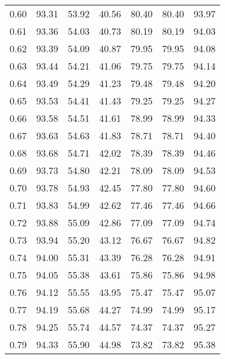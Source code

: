 \begin{tabular}{|c|c|c|c|c|c|c|}
      0.60 &     93.31 &     53.92 &      40.56 &   80.40 &      80.40 &         93.97 \\
      0.61 &     93.36 &     54.03 &      40.73 &   80.19 &      80.19 &         94.03 \\
      0.62 &     93.39 &     54.09 &      40.87 &   79.95 &      79.95 &         94.08 \\
      0.63 &     93.44 &     54.21 &      41.06 &   79.75 &      79.75 &         94.14 \\
      0.64 &     93.49 &     54.29 &      41.23 &   79.48 &      79.48 &         94.20 \\
      0.65 &     93.53 &     54.41 &      41.43 &   79.25 &      79.25 &         94.27 \\
      0.66 &     93.58 &     54.51 &      41.61 &   78.99 &      78.99 &         94.33 \\
      0.67 &     93.63 &     54.63 &      41.83 &   78.71 &      78.71 &         94.40 \\
      0.68 &     93.68 &     54.71 &      42.02 &   78.39 &      78.39 &         94.46 \\
      0.69 &     93.73 &     54.80 &      42.21 &   78.09 &      78.09 &         94.53 \\
      0.70 &     93.78 &     54.93 &      42.45 &   77.80 &      77.80 &         94.60 \\
      0.71 &     93.83 &     54.99 &      42.62 &   77.46 &      77.46 &         94.66 \\
      0.72 &     93.88 &     55.09 &      42.86 &   77.09 &      77.09 &         94.74 \\
      0.73 &     93.94 &     55.20 &      43.12 &   76.67 &      76.67 &         94.82 \\
      0.74 &     94.00 &     55.31 &      43.39 &   76.28 &      76.28 &         94.91 \\
      0.75 &     94.05 &     55.38 &      43.61 &   75.86 &      75.86 &         94.98 \\
      0.76 &     94.12 &     55.55 &      43.95 &   75.47 &      75.47 &         95.07 \\
      0.77 &     94.19 &     55.68 &      44.27 &   74.99 &      74.99 &         95.17 \\
      0.78 &     94.25 &     55.74 &      44.57 &   74.37 &      74.37 &         95.27 \\
      0.79 &     94.33 &     55.90 &      44.98 &   73.82 &      73.82 &         95.38 \\

\end{tabular}
